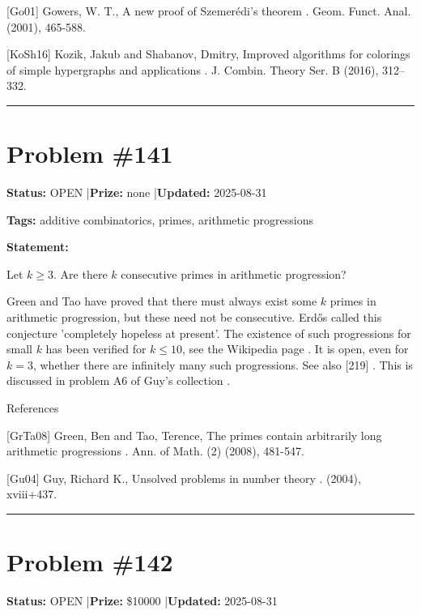 \documentclass{article}
\begin{document}
[Go01] Gowers, W. T., A new proof of Szemer\'{e}di's theorem . Geom. Funct. Anal. (2001), 465-588.

[KoSh16] Kozik, Jakub and Shabanov, Dmitry, Improved algorithms for colorings of simple hypergraphs and applications . J. Combin. Theory Ser. B (2016), 312--332.

\noindent\rule{\linewidth}{0.4pt}


\section{Problem \#141}
\label{prob:141}

\noindent\textbf{Status:} OPEN \quad|\quad \textbf{Prize:} none \quad|\quad \textbf{Updated:} 2025-08-31

\noindent\textbf{Tags:} additive combinatorics, primes, arithmetic progressions

\medskip

\noindent\textbf{Statement:}

Let $k\geq 3$. Are there $k$ consecutive primes in arithmetic progression?




Green and Tao \cite{GrTa08} have proved that there must always exist some $k$ primes in arithmetic progression, but these need not be consecutive. Erd\H{o}s called this conjecture 'completely hopeless at present'. The existence of such progressions for small $k$ has been verified for $k\leq 10$, see the Wikipedia page . It is open, even for $k=3$, whether there are infinitely many such progressions. See also [219] . This is discussed in problem A6 of Guy's collection \cite{Gu04}.




References

[GrTa08] Green, Ben and Tao, Terence, The primes contain arbitrarily long arithmetic progressions . Ann. of Math. (2) (2008), 481-547.

[Gu04] Guy, Richard K., Unsolved problems in number theory . (2004), xviii+437.

\noindent\rule{\linewidth}{0.4pt}


\section{Problem \#142}
\label{prob:142}

\noindent\textbf{Status:} OPEN \quad|\quad \textbf{Prize:} \$10000 \quad|\quad \textbf{Updated:} 2025-08-31
\end{document}
